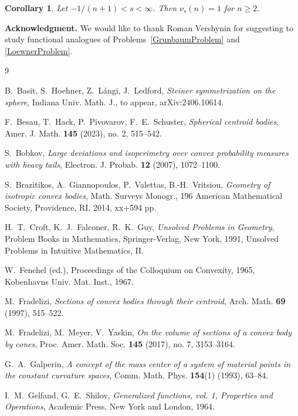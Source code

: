 \documentclass[12pt,letterpaper,reqno]{amsart}
\newtheorem{corollary}[theorem]{Corollary}
\theoremstyle{definition}
\begin{document}
	\begin{corollary}
	Let $-1/(n+1)<s<\infty$. Then	$\nu_s (n)=1$ for $n\ge 2$.
	\end{corollary}
	


\bigskip

{\bf Acknowledgment.} We would like to thank Roman Vershynin for suggesting to study functional analogues of Problems~\ref{GrunbaumProblem} and \ref{LoewnerProblem}. 

\begin{thebibliography}{9}	
	
	 B.~Basit, S.~Hoehner, Z.~L\'angi, J.~Ledford, {\em 
	Steiner symmetrization on the sphere}, Indiana Univ. Math. J., to appear,	
arXiv:2406.10614.
	
	
		F.~Besau, T.~Hack, P.~Pivovarov, F.~E.~Schuster, {\em  Spherical centroid bodies}, Amer. J. Math. {\bf 145} (2023), no. 2, 515--542. 
	
	 	S.~Bobkov, {\em 	Large deviations and isoperimetry over convex probability measures with heavy tails}, 	Electron. J. Probab. {\bf 12} (2007), 1072--1100.
	
	 S.~Brazitikos, 
	A.~Giannopoulos, P.~Valettas, B.-H.~Vritsiou,  {\em Geometry of isotropic convex bodies},
	Math. Surveys Monogr., 196
	American Mathematical Society, Providence, RI, 2014, xx+594 pp.
	
	 H.~T.~Croft, K.~J.~Falconer, R.~K.~Guy, {\em Unsolved Problems in Geometry},  Problem Books in Mathematics, Springer-Verlag, New York, 1991, Unsolved Problems in Intuitive Mathematics, II.
	
	
	 W.~Fenchel (ed.), Proceedings of the Colloquium on Convexity, 1965, Kobenhavns Univ. Mat. Inst., 1967.
	
		M.~Fradelizi, {\em Sections of convex bodies through their centroid}, Arch. Math. {\bf 69} (1997), 515--522.
	
	M.~Fradelizi, M.~Meyer, V.~Yaskin, {\em On the volume of sections of a convex body by cones}, Proc. Amer. Math. Soc. \textbf{145} (2017), no. 7, 3153--3164.
	
	 G.~A.~Galperin, {\em A concept of the mass center of a system of material points in the constant curvature spaces}, Comm. Math. Phys. {\bf 154}(1) (1993), 63--84.
	
	
 I.~M.~Gelfand, G.~E.~Shilov, {\em Generalized functions, vol. 1, Properties and Operations}, Academic	Press, New York and London, 1964.
	

\end{thebibliography}
\end{document}
